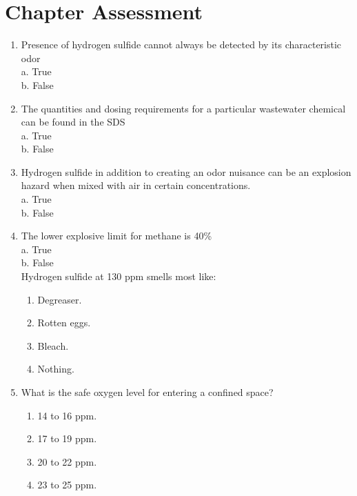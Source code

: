 \newpage
\section*{Chapter Assessment}
\begin{tcolorbox}[breakable, enhanced,
colframe=blue!25,
colback=blue!10,
coltitle=blue!20!black,  
title= Chapter Assessment]

\begin{enumerate}
\item Presence of hydrogen sulfide cannot always be detected by its characteristic odor \\

a. True \\
b. False \\

\item The quantities and dosing requirements for a particular wastewater chemical can be found in the SDS \\

a. True \\
b. False \\

\item Hydrogen sulfide in addition to creating an odor nuisance can be an explosion hazard when mixed with air in certain concentrations. \\

a. True \\
b. False \\

\item The lower explosive limit for methane is 40\% \\

a. True \\
b. False \\

Hydrogen sulfide at 130 ppm smells most like:
\begin{enumerate}

\item Degreaser.
\item Rotten eggs.
\item Bleach.
\item Nothing.
\end{enumerate}

\item What is the safe oxygen level for entering a confined space?
\begin{enumerate}
\item 14 to 16 ppm.
\item 17 to 19 ppm.
\item 20 to 22 ppm.
\item 23 to 25 ppm.
\end{enumerate}


\end{enumerate}
\end{tcolorbox}
